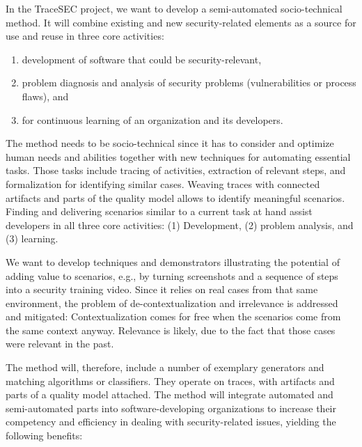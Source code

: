 In the TraceSEC project, we want to develop a semi-automated socio-technical method. It will combine existing and new security-related elements as a source for use and reuse in three core activities:
\begin{enumerate}
	\vspace{-0.5em} \item development of software that could be security-relevant, 
	\vspace{-0.5em} \item problem diagnosis and analysis of security problems (vulnerabilities or process flaws), and 
	\vspace{-0.5em} \item for continuous learning of an organization and its developers.
\end{enumerate}

The method needs to be socio-technical since it has to consider and optimize human needs and abilities together with new techniques for automating essential tasks. Those tasks include tracing of activities, extraction of relevant steps, and formalization for identifying similar cases. Weaving traces with connected artifacts and parts of the quality model allows to identify meaningful scenarios. Finding and delivering scenarios similar to a current task at hand assist developers in all three core activities: (1) Development, (2) problem analysis, and (3) learning. 

We want to develop techniques and demonstrators illustrating the potential of adding value to scenarios, e.g., by turning screenshots and a sequence of steps into a security training video. Since it relies on real cases from that same environment, the problem of de-contextualization and irrelevance is addressed and mitigated: Contextualization comes for free when the scenarios come from the same context anyway. Relevance is likely, due to the fact that those cases were relevant in the past.

The method will, therefore, include a number of exemplary generators and matching algorithms or classifiers. They operate on traces, with artifacts and parts of a quality model attached. The method will integrate automated and semi-automated parts into software-developing organizations to increase their competency and efficiency in dealing with security-related issues, yielding the following benefits:

